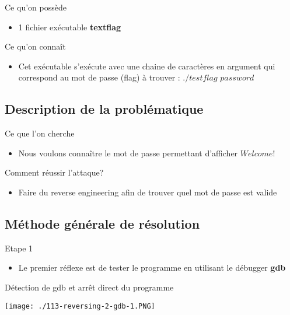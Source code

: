\documentclass{beamer}
\begin{document}
	\begin{frame}
	
	\begin{block}{Ce qu'on possède} 
		\begin{itemize}
			\item 1 fichier exécutable \textbf{textflag}
		\end{itemize}
	\end{block}

	\begin{block}{Ce qu'on connaît} 
	\begin{itemize}
		[circle]
		\item Cet exécutable s'exécute avec une chaine de caractères en argument qui correspond au mot de passe (flag) à trouver : $./testflag$ $password$
	\end{itemize}
	\end{block}
	
	\end{frame}

	\subsection{Description de la problématique}
	
	\begin{frame}
	\begin{block}{Ce que l'on cherche}
		\begin{itemize}
			\item Nous voulons connaître le mot de passe permettant d'afficher $Welcome!$ 
		\end{itemize}
	\end{block}
	\begin{block}{Comment réussir l'attaque?}
		\begin{itemize}
			\item Faire du reverse engineering afin de trouver quel mot de passe est valide
		\end{itemize}
	\end{block}
	\end{frame}

	\subsection{Méthode générale de résolution}
	\begin{frame}
	\begin{block}{Etape 1}
		\begin{itemize}
			\item Le premier réflexe est de tester le programme en utilisant le débugger \textbf{gdb}
		\end{itemize}
	\end{block}
	\begin{exampleblock}{Détection de gdb et arrêt direct du programme} 
		\begin{center}
			\texttt{[image: ./113-reversing-2-gdb-1.PNG]}
		\end{center}
	\end{exampleblock}
	\end{frame}
\end{document}
